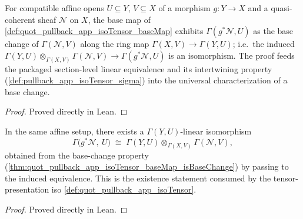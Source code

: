 \begin{theorem}

  \label{thm:quot_pullback_app_isoTensor_baseMap_isBaseChange}
  For compatible affine opens \(U \subseteq Y\), \(V \subseteq X\) of a
  morphism \(g : Y \to X\) and a quasi-coherent sheaf \(\mathcal{N}\) on
  \(X\), the base map of \cref{def:quot_pullback_app_isoTensor_baseMap}
  exhibits \(\Gamma(g^* \mathcal{N}, U)\) as the base change of
  \(\Gamma(\mathcal{N}, V)\) along the ring map
  \(\Gamma(X, V) \to \Gamma(Y, U)\); i.e.\ the induced
  \(\Gamma(Y, U) \otimes_{\Gamma(X, V)} \Gamma(\mathcal{N}, V)
   \to \Gamma(g^* \mathcal{N}, U)\) is an isomorphism. The proof feeds the
  packaged section-level linear equivalence and its intertwining property
  (\cref{def:pullback_app_isoTensor_sigma}) into the universal
  characterization of a base change.
\end{theorem}
\begin{proof} Proved directly in Lean. \end{proof}

\begin{theorem}

  \label{thm:quot_pullback_app_isoTensor_isBaseChange}
  In the same affine setup, there exists a \(\Gamma(Y, U)\)-linear
  isomorphism
  \[
    \Gamma\bigl(g^* \mathcal{N},\ U\bigr)
    \;\cong\;
    \Gamma(Y, U) \otimes_{\Gamma(X, V)} \Gamma(\mathcal{N}, V),
  \]
  obtained from the base-change property
  (\cref{thm:quot_pullback_app_isoTensor_baseMap_isBaseChange}) by passing to
  the induced equivalence. This is the existence statement consumed by the
  tensor-presentation iso \cref{def:quot_pullback_app_isoTensor}.
\end{theorem}
\begin{proof} Proved directly in Lean. \end{proof}

